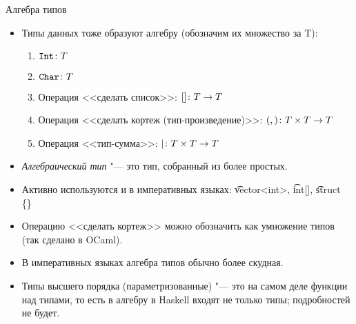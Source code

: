 \begin{frame}{Алгебра типов}
	\begin{itemize}
		\item Типы данных тоже образуют алгебру (обозначим их множество за T):
			\begin{enumerate}
				\item $\t{Int} \colon T$
				\item $\t{Char} \colon T$
				\item Операция <<сделать список>>: $\t{[]} \colon T \to T$
				\item Операция <<сделать кортеж (тип-произведение)>>: $\t{(,)} \colon T \times T \to T$
				\item Операция <<тип-сумма>>: $\t{|} \colon T \times T \to T$
			\end{enumerate}
		\item \textit{Алгебраический тип} "--- это тип, собранный из более простых.
		\item Активно используются и в императивных языках: \t{vector<int>}, \t{int[]}, \t{struct \{\}}
		\item Операцию <<сделать кортеж>> можно обозначить как умножение типов (так сделано в OCaml).
		\item В императивных языках алгебра типов обычно более скудная.
		\item
			Типы высшего порядка (параметризованные) "--- это на самом деле функции над типами,
			то есть в алгебру в Haskell входят не только типы; подробностей не будет.
	\end{itemize}
\end{frame}
